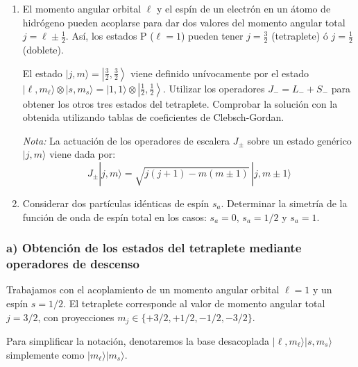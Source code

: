 \newpage
\begin{problema}
\begin{enumerate}[label=\alph*)]
    \item El momento angular orbital $\ell$ y el espín de un electrón en un átomo de hidrógeno pueden acoplarse para dar dos valores del momento angular total $j = \ell \pm \frac{1}{2}$. Así, los estados P ($\ell = 1$) pueden tener $j = \frac{3}{2}$ (tetraplete) ó $j = \frac{1}{2}$ (doblete). 
    
    El estado $|j, m\rangle = \left|\frac{3}{2}, \frac{3}{2}\right\rangle$ viene definido unívocamente por el estado $|\ell, m_\ell\rangle \otimes |s, m_s\rangle = |1, 1\rangle \otimes \left|\frac{1}{2}, \frac{1}{2}\right\rangle$. Utilizar los operadores $J_- = L_- + S_-$ para obtener los otros tres estados del tetraplete. Comprobar la solución con la obtenida utilizando tablas de coeficientes de Clebsch-Gordan.

    \textit{Nota:} La actuación de los operadores de escalera $J_\pm$ sobre un estado genérico $|j, m\rangle$ viene dada por:
    \begin{equation*}
    J_\pm |j, m\rangle = \sqrt{j(j+1) - m(m \pm 1)} \, |j, m \pm 1\rangle
    \end{equation*}

    \item Considerar dos partículas idénticas de espín $s_a$. Determinar la simetría de la función de onda de espín total en los casos: $s_a = 0$, $s_a = 1/2$ y $s_a = 1$.
\end{enumerate}

\tcblower

\subsubsection*{a) Obtención de los estados del tetraplete mediante operadores de descenso}

Trabajamos con el acoplamiento de un momento angular orbital $\ell = 1$ y un espín $s = 1/2$. El tetraplete corresponde al valor de momento angular total $j = 3/2$, con proyecciones $m_j \in \{+3/2, +1/2, -1/2, -3/2\}$.

Para simplificar la notación, denotaremos la base desacoplada $|\ell, m_\ell\rangle |s, m_s\rangle$ simplemente como $|m_\ell\rangle |m_s\rangle$.


\end{problema}
